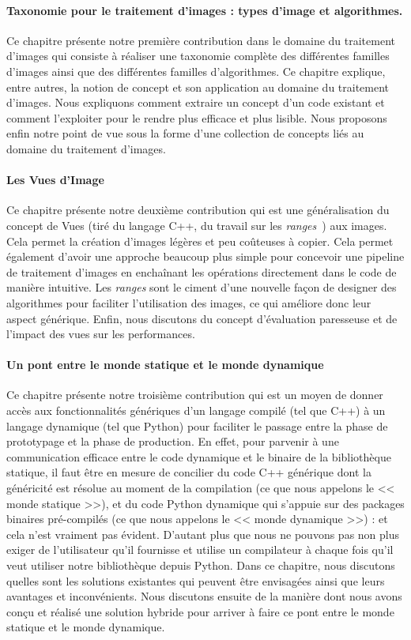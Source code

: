 \paragraph{Taxonomie pour le traitement d'images : types d'image et algorithmes.} Ce chapitre présente notre première
contribution dans le domaine du traitement d'images qui consiste à réaliser une taxonomie complète des différentes
familles d'images ainsi que des différentes familles d'algorithmes. Ce chapitre explique, entre autres, la notion de
concept et son application au domaine du traitement d'images. Nous expliquons comment extraire un concept d'un code
existant et comment l'exploiter pour le rendre plus efficace et plus lisible. Nous proposons enfin notre point de vue
sous la forme d'une collection de concepts liés au domaine du traitement d'images.

\paragraph{Les Vues d'Image} Ce chapitre présente notre deuxième contribution qui est une généralisation du concept de
Vues (tiré du langage C++, du travail sur les \emph{ranges}~\parencite{niebler.2018.ranges}) aux images. Cela permet la
création d'images légères et peu coûteuses à copier. Cela permet également d'avoir une approche beaucoup plus simple
pour concevoir une pipeline de traitement d'images en enchaînant les opérations directement dans le code de manière
intuitive. Les \emph{ranges} sont le ciment d'une nouvelle façon de designer des algorithmes pour faciliter
l'utilisation des images, ce qui améliore donc leur aspect générique. Enfin, nous discutons du concept d'évaluation
paresseuse et de l'impact des vues sur les performances.

\paragraph{Un pont entre le monde statique et le monde dynamique} Ce chapitre présente notre troisième contribution qui
est un moyen de donner accès aux fonctionnalités génériques d'un langage compilé (tel que C++) à un langage dynamique
(tel que Python) pour faciliter le passage entre la phase de prototypage et la phase de production. En effet, pour
parvenir à une communication efficace entre le code dynamique et le binaire de la bibliothèque statique, il faut être en
mesure de concilier du code C++ générique dont la généricité est résolue au moment de la compilation (ce que nous
appelons le << monde statique >>), et du code Python dynamique qui s'appuie sur des packages binaires pré-compilés (ce
que nous appelons le << monde dynamique >>) : et cela n'est vraiment pas évident. D'autant plus que nous ne pouvons pas
non plus exiger de l'utilisateur qu'il fournisse et utilise un compilateur à chaque fois qu'il veut utiliser notre
bibliothèque depuis Python. Dans ce chapitre, nous discutons quelles sont les solutions existantes qui peuvent être
envisagées ainsi que leurs avantages et inconvénients. Nous discutons ensuite de la manière dont nous avons conçu et
réalisé une solution hybride pour arriver à faire ce pont entre le monde statique et le monde dynamique.


